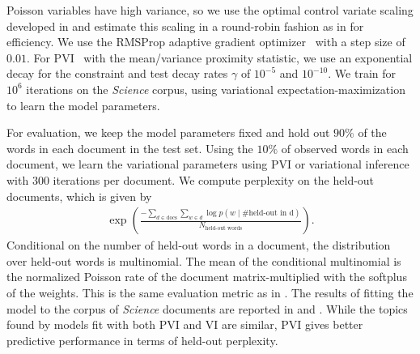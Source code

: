 Poisson variables have high variance, so we use  the optimal control variate scaling developed in \citet{ranganath2014black} and estimate this scaling in a round-robin fashion as in \citet{Mnih:2016:VIM:3045390.3045621} for efficiency. We use the RMSProp adaptive gradient optimizer~\citep{Hinton} with a step size of $0.01$. For \gls{PVI}~ with the mean/variance proximity statistic, we use an exponential decay for the constraint and test decay rates $\gamma$ of $10^{-5}$ and $10^{-10}$. We train for $10^6$ iterations on the \emph{Science} corpus, using variational expectation-maximization to learn the model parameters.


For evaluation, we keep the model parameters fixed and hold out $90\%$ of the words in each document in the test set. Using the $10\%$ of observed words in each document, we learn the variational parameters using \gls{PVI} or variational inference with $300$ iterations per document. We compute perplexity on the held-out documents, which is given by
\begin{align*}
\exp\left(\frac{-\sum_{d\in{\textrm{docs}}} \sum_{w\in d} \log p(w \mid
\textrm{\# held-out in d})}{N_{\textrm{held-out words}}}\right).
\end{align*}
Conditional on the number of held-out words in a document, the distribution over held-out words is multinomial. The mean of the conditional multinomial is the normalized Poisson rate of the document matrix-multiplied with the softplus of the weights. This is the same evaluation metric as in \citet{ranganath2015deep}. The results of fitting the model to the corpus of \emph{Science} documents are reported in  and . While the topics found by models fit with both \gls{PVI} and \gls{VI} are similar, \gls{PVI} gives better predictive performance in terms of held-out perplexity.